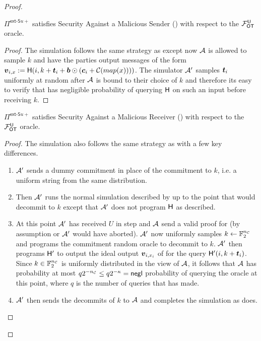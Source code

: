 \begin{proof}

	\begin{claim}\label{claim:ext-Su-U-MalSender}
		$\Pi^{\textsf{ext-S}u+}$ satisfies Security Against a Malicious Sender () with respect to the $\OOT^\U$ oracle.
	\end{claim}

	\begin{proof}
		The simulation follows the same strategy as  except now $\Adv$ is allowed to sample $k$ and have the parties output messages of the form $\vv_{i,x}:=\H(i, k + \tt_i + \bb \odot (\cc_i + \mathcal{C}(map(x))))$. The simulator $\Adv'$ samples $\tt_i$ uniformly at random after $\Adv$ is bound to their choice of $k$ and therefore its easy to verify that \Adv has negligible probability of querying $\H$ on such an input before receiving $k$.
		\pe
	\end{proof}
	
	\begin{claim}\label{claim:ext-Su-U-MalReceiver}
		$\Pi^{\textsf{ext-S}u+}$ satisfies Security Against a Malicious Receiver () with respect to the $\OOT^\U$ oracle.
	\end{claim}
	\begin{proof}
		The simulation also follows the same strategy as  with a few key differences. 
		\begin{enumerate}
			\item $\Adv'$ sends a dummy commitment in place of the commitment to $k$, i.e. a uniform string from the same distribution.
			\item Then $\Adv'$ runs the normal simulation described by   up to the point that \send would decommit to $k$ except that $\Adv'$ does not program $\H$ as described.
			
			\item At this point $\Adv'$ has received $U$ in step  and $\Adv$ send a valid proof for  (by assumption or $\Adv'$ would have aborted). $\Adv'$ now uniformly samples $k\gets\mathbb{F}^\nc_2$ and programs the commitment random oracle to decommit to $k$. $\Adv'$ then programs $\H'$ to output the ideal output $\vv_{i,x_i}$ of \rec for the query $\H'(i,k + \tt_i)$. Since $k\in\mathbb{F}^\nc_2$ is uniformly distributed in the view of $\Adv$, it follows that $\Adv$ has probability at most $q 2^{-\nc}\leq q2^{-\kappa}=\negl$ probability of querying the oracle at this point, where $q$ is the number of queries that \Adv has made.
			\item $\Adv'$ then sends the decommits of $k$ to $\Adv$ and completes the simulation as  does.
		\end{enumerate} 
		\pe
	\end{proof}
	\pe
\end{proof}


